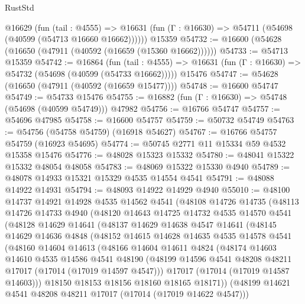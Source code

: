 \begin{lexlean}{RustStd}
\begin{coremodule}
{\begin{coremodule}
{{{{{{{{{{{{{{{{{{{{{{{{{{{{{{{{{{{{{{{{{{{{{{{{{{{{{{{    @16629
      (fun (tail : @4555) =>
      @16631 (fun (Γ : @16630) => @54711 (@54698 (@40599 (@54713 @16660 @16662))))))
    @15359
@54732 := @16600 (@54628 (@16650 (@47911 (@40592 (@16659 (@15360 @16662))))))
@54733 := @54713 @15359
@54742 := @16864
    (fun (tail : @4555) => @16631 (fun (Γ : @16630) => @54732 (@54698 (@40599 (@54733 @16662)))))
    @15476
@54747 := @54628 (@16650 (@47911 (@40592 (@16659 @15477))))
@54748 := @16600 @54747
@54749 := @54733 @15476
@54755 := @16882 (fun (Γ : @16630) => @54748 (@54698 (@40599 @54749))) @47982
@54756 := @16766 @54747
@54757 := @54696 @47985
@54758 := @16600 @54757
@54759 := @50732 @54749
@54763 := @54756 (@54758 @54759) (@16918 @54627)
@54767 := @16766 @54757 @54759 (@16923 @54695)
@54774 := @50745 @2771 @11 @15334 @59 @4532 @15358 @15476
@54776 := @48028 @15323 @15332
@54780 := @48041 @15322 @15332 @48054 @48058
@54783 := @48069 @15322 @15330 @4940
@54789 := @48078 @14933 @15321 @15329 @4535 @14554 @4541
@54791 := @48088 @14922 @14931
@54794 := @48093 @14922 @14929 @4940
@55010 := @48100
    @14737
    @14921
    @14928
    @4535
    @14562
    @4541
    (@48108
      @14726
      @14735
      (@48113
        @14726
        @14733
        @4940
        (@48120
          @14643
          @14725
          @14732
          @4535
          @14570
          @4541
          (@48128
            @14629
            @14641
            (@48137
              @14629
              @14638
              @4547
              @14641
              (@48145
                @14629
                @14636
                @4848
                (@48152
                  @14615
                  @14628
                  @14635
                  @4535
                  @14578
                  @4541
                  (@48160
                    @14604
                    @14613
                    (@48166
                      @14604
                      @14611
                      @4824
                      (@48174
                        @14603
                        @14610
                        @4535
                        @14586
                        @4541
                        @48190
                        (@48199 @14596 @4541 @48208 @48211 @17017 (@17014 (@17019 @14597 @4547)))
                        @17017
                        (@17014 (@17019 @14587 @14603)))
                      @18150
                      @18153
                      @18156
                      @18160
                      @18165
                      @18171))
                  (@48199 @14621 @4541 @48208 @48211 @17017 (@17014 (@17019 @14622 @4547)))
}}}}}}}}}}}}}}}}}}}}}}}}}}}}}}}}}}}}}}}}}}}}}}}}}}}}}}}
\end{coremodule}}
\end{coremodule}
\end{lexlean}
